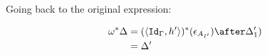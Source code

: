 {Going back to the original expression:

\begin{align}
    \w\star{\D} & = (\pr{\Id{\G}}{h'})\star(\e_{A_{I'}})\after\D_1')\\
    & = \D'\\
\end{align}


}

\newcommand{\effectWeakeningTermSubstitution}[0]{
    

If $\w = \deno{\wrelw{\P'}{\P}}$, then $\deno{\etyperelation{\P'}{\G'}{\si}{\G}} = \w\star\deno{\etyperelation{\P}{\G'}{\si}{\G}}$.

\proof
By induction on the structure of $\si$, making use of the weakening of term denotations above.

\case{Nil}
Then $\si = \term{\G'_{I}}$, so $\w\star(\si) = \term{\G'_{I'}} = \deno{\etyperelation{\P'}{\G'}{\si}{\G}}$

\case{Var}
Then $\si = (\si',x\setto v)$

\begin{align}
    \w\star\si & = \w*\pr{\si'}{\deno{\gpetyperelation{v}{A}}}\\
    & = \pr{\w\star\si'}{\w\star\deno{\gpetyperelation{v}{A}}}\\
    &=\pr{\deno{\etyperelation{\P'}{\G'}{\si'}{\G}}}{\deno{\etyperelation{\G'}{\P'}{v}{A}}}\\
    &=\deno{\etyperelation{\P'}{\G'}{\si}{\gax}}
\end{align}

}


